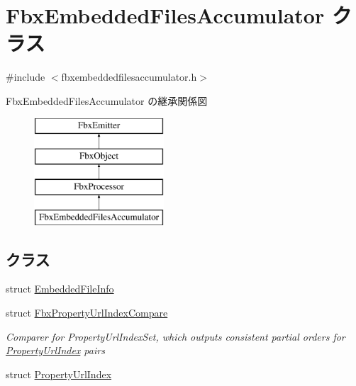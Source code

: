\hypertarget{class_fbx_embedded_files_accumulator}{}\section{Fbx\+Embedded\+Files\+Accumulator クラス}
\label{class_fbx_embedded_files_accumulator}


{\ttfamily \#include $<$fbxembeddedfilesaccumulator.\+h$>$}

Fbx\+Embedded\+Files\+Accumulator の継承関係図\begin{figure}[H]
\begin{center}
\leavevmode
\includegraphics[height=4.000000cm]{class_fbx_embedded_files_accumulator}
\end{center}
\end{figure}
\subsection*{クラス}
\begin{DoxyCompactItemize}
\item 
struct \hyperlink{struct_fbx_embedded_files_accumulator_1_1_embedded_file_info}{Embedded\+File\+Info}
\item 
struct \hyperlink{struct_fbx_embedded_files_accumulator_1_1_fbx_property_url_index_compare}{Fbx\+Property\+Url\+Index\+Compare}
\begin{DoxyCompactList}\small\item\em Comparer for Property\+Url\+Index\+Set, which outputs consistent partial orders for \hyperlink{struct_fbx_embedded_files_accumulator_1_1_property_url_index}{Property\+Url\+Index} pairs \end{DoxyCompactList}\item 
struct \hyperlink{struct_fbx_embedded_files_accumulator_1_1_property_url_index}{Property\+Url\+Index}
\end{DoxyCompactItemize}
